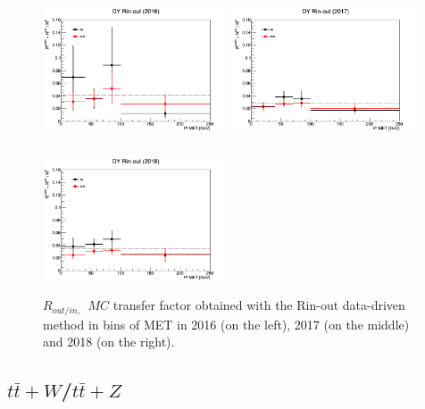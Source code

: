 \documentclass[a4paper, 10pt, openright]{report}
\begin{document}
\begin{figure}[htbp]
\begin{center}
\begin{minipage}[b]{.32\textwidth}
\includegraphics[width=5.5cm, height=4.3cm]{figs/Rinout2016.png}
\end{minipage} \hfill
\begin{minipage}[b]{.32\textwidth}
\includegraphics[width=5.5cm, height=4.3cm]{figs/Rinout2017.png}
\end{minipage} \hfill
\begin{minipage}[b]{.32\textwidth}
\includegraphics[width=5.5cm, height=4.3cm]{figs/Rinout2018.png}
\end{minipage} \hfill
\caption{$R_{out/in,\text{ }} MC$ transfer factor obtained with the Rin-out data-driven method in bins of \ac{MET} in 2016 (on the left), 2017 (on the middle) and 2018 (on the right).}
\label{fig:Rinoutcheck}
\end{center}
\end{figure}

\subsection{$t \bar t + W$/$t \bar t + Z$} \label{subsection:ttV}
\end{document}
